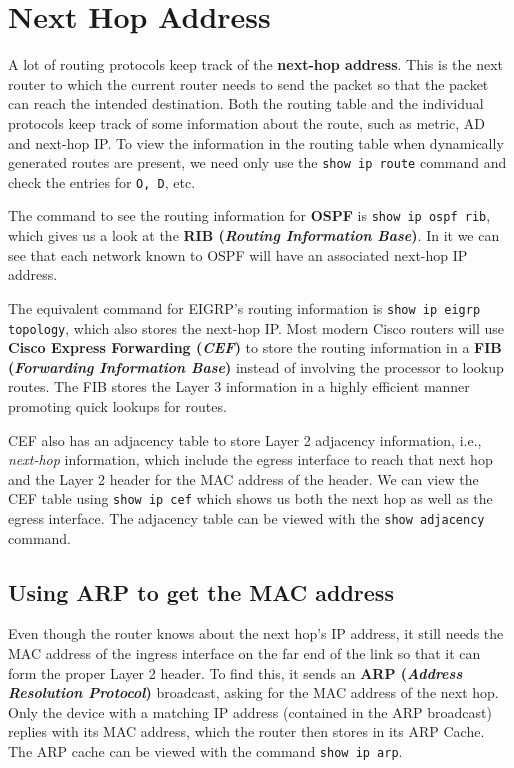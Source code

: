 \section{Next Hop Address}
A lot of routing protocols keep track of the \textbf{next-hop address}. This is the next router to which the current router needs to send the packet so that the packet can reach the intended destination. Both the routing table and the individual protocols keep track of some information about the route, such as metric, AD and next-hop IP. To view the information in the routing table when dynamically generated routes are present, we need only use the \verb|show ip route| command and check the entries for \verb|O, D|, etc. 

The command to see the routing information for \textbf{OSPF} is \verb|show ip ospf rib|, which gives us a look at the \textbf{RIB (\textit{Routing Information Base})}. In it we can see that each network known to OSPF will have an associated next-hop IP address. 

The equivalent command for EIGRP's routing information is \verb|show ip eigrp topology|, which also stores the next-hop IP. Most modern Cisco routers will use \textbf{Cisco Express Forwarding (\textit{CEF})} to store the routing information in a \textbf{FIB (\textit{Forwarding Information Base})} instead of involving the processor to lookup routes. The FIB stores the Layer 3 information in a highly efficient manner promoting quick lookups for routes. 

CEF also has an adjacency table to store Layer 2 adjacency information, i.e., \textit{next-hop} information, which include the egress interface to reach that next hop and the Layer 2 header for the MAC address of the header. We can view the CEF table using \verb|show ip cef| which shows us both the next hop as well as the egress interface. The adjacency table can be viewed with the \verb|show adjacency| command. 

\subsection{Using ARP to get the MAC address}
Even though the router knows about the next hop's IP address, it still needs the MAC address of the ingress interface on the far end of the link so that it can form the proper Layer 2 header. To find this, it sends an \textbf{ARP (\textit{Address Resolution Protocol})} broadcast, asking for the MAC address of the next hop. Only the device with a matching IP address (contained in the ARP broadcast) replies with its MAC address, which the router then stores in its ARP Cache. The ARP cache can be viewed with the command \verb|show ip arp|. 

